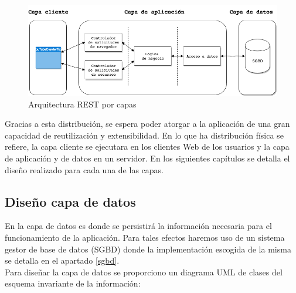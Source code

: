 \documentclass[11pt,a4paper]{article}
\begin{document}
\begin{figure}[H]
\centering
\includegraphics[scale=0.40]{diseno/ArquitecturaRESTPorCapas.png}
\caption{Arquitectura REST por capas}
\end{figure}

Gracias a esta distribución, se espera poder atorgar a la aplicación de una gran capacidad de reutilización y extensibilidad. En lo que ha distribución física se refiere, la capa cliente se ejecutara en los clientes Web de los usuarios y la capa de aplicación y de datos en un servidor. En los siguientes capítulos se detalla el diseño realizado para cada una de las capas.
\medskip 

\subsection{Diseño capa de datos}\label{disenoDatos} 
En la capa de datos es donde se persistirá la información necesaria para el funcionamiento de la aplicación. Para tales efectos haremos uso de un sistema gestor de base de datos (SGBD) donde la implementación escogida de la misma se detalla en el apartado \ref{sgbd}.
\\

Para diseñar la capa de datos se proporciono un diagrama UML de clases del esquema invariante de la información:
\end{document}
